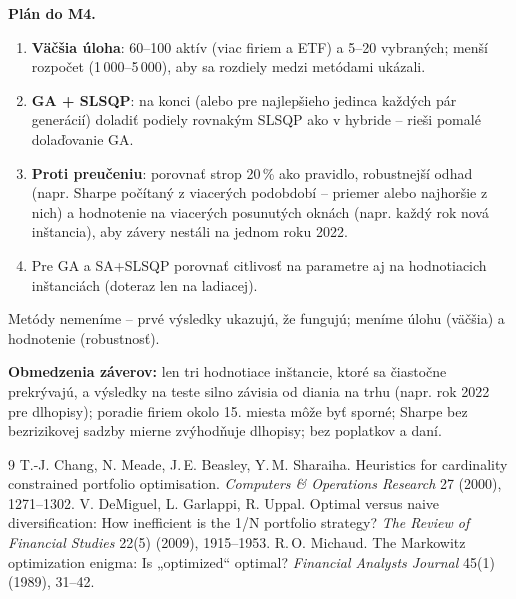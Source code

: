 \documentclass[10pt,a4paper]{article}
\begin{document}
\textbf{Plán do M4.}
\begin{enumerate}
\item \textbf{Väčšia úloha}: 60--100 aktív (viac firiem a ETF) a 5--20 vybraných; menší rozpočet
  (1\,000--5\,000), aby sa rozdiely medzi metódami ukázali.
\item \textbf{GA + SLSQP}: na konci (alebo pre najlepšieho jedinca každých pár generácií) doladiť
  podiely rovnakým SLSQP ako v hybride -- rieši pomalé dolaďovanie GA.
\item \textbf{Proti preučeniu}: porovnať strop 20\,\% ako pravidlo, robustnejší odhad (napr. Sharpe
  počítaný z viacerých podobdobí -- priemer alebo najhoršie z nich) a hodnotenie na viacerých
  posunutých oknách (napr. každý rok nová inštancia), aby závery nestáli na jednom roku 2022.
\item Pre GA a SA+SLSQP porovnať citlivosť na parametre aj na hodnotiacich inštanciách
  (doteraz len na ladiacej).
\end{enumerate}
Metódy nemeníme -- prvé výsledky ukazujú, že fungujú; meníme úlohu (väčšia) a hodnotenie (robustnosť).

\textbf{Obmedzenia záverov:} len tri hodnotiace inštancie, ktoré sa čiastočne prekrývajú, a výsledky na
teste silno závisia od diania na trhu (napr. rok 2022 pre dlhopisy); poradie firiem okolo 15. miesta
môže byť sporné; Sharpe bez bezrizikovej sadzby mierne zvýhodňuje dlhopisy; bez poplatkov a daní.

{\footnotesize
\begin{thebibliography}{9}\setlength{\itemsep}{0pt}
 T.-J. Chang, N. Meade, J.\,E. Beasley, Y.\,M. Sharaiha. Heuristics for cardinality
  constrained portfolio optimisation. \emph{Computers \& Operations Research} 27 (2000), 1271--1302.
 V. DeMiguel, L. Garlappi, R. Uppal. Optimal versus naive diversification: How
  inefficient is the 1/N portfolio strategy? \emph{The Review of Financial Studies} 22(5) (2009), 1915--1953.
 R.\,O. Michaud. The Markowitz optimization enigma: Is „optimized“ optimal?
  \emph{Financial Analysts Journal} 45(1) (1989), 31--42.
\end{thebibliography}}
\end{document}
